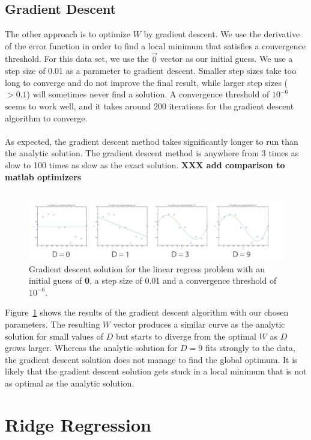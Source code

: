 \documentclass[10pt]{article}   %
\theoremstyle{plain}
\begin{document}
\subsection{Gradient Descent}
The other approach is to optimize $W$ by gradient descent. We use the derivative of the error function in order to find a local minimum that satisfies a convergence threshold. For this data set, we use the \textbf{$\overrightarrow{0}$} vector as our initial guess. We use a step size of 0.01 as a parameter to gradient descent. Smaller step sizes take too long to converge and do not improve the final result, while larger step sizes ($> 0.1$) will sometimes never find a solution. A convergence threshold of $10^{-6}$ seems to work well, and it takes around $200$ iterations for the gradient descent algorithm to converge. \\
\\
\indent As expected, the gradient descent method takes significantly longer to run than the analytic solution. The gradient descent method is anywhere from 3 times as slow to 100 times as slow as the exact solution. \textbf{XXX add comparison to matlab optimizers} \\
\\
\begin{figure}[h!]\label{fig-gradient}
  \caption{Gradient descent solution for the linear regress problem with an initial guess of \textbf{0}, a step size of 0.01 and a convergence threshold of $10^{-6}$.}
  \centering
    \includegraphics[width=1.0\textwidth]{figures/problem_2_2_full.png}
\end{figure}

\indent Figure~\ref{fig-gradient} shows the results of the gradient descent algorithm with our chosen parameters. The resulting $W$ vector produces a similar curve as the analytic solution for small values of $D$ but starts to diverge from the optimal $W$ as $D$ grows larger. Whereas the analytic solution for $D=9$ fits strongly to the data, the gradient descent solution does not manage to find the global optimum. It is likely that the gradient descent solution gets stuck in a local minimum that is not as optimal as the analytic solution.

\section{Ridge Regression}\label{sec-ridge}
\end{document}
